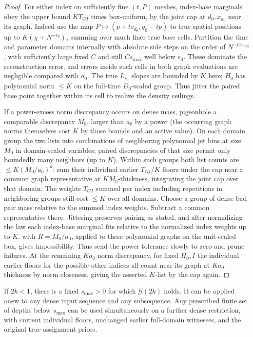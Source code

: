 \begin{proof}
For either index on sufficiently fine \((t,P)\) meshes, index-base marginals obey the upper bound \(K T_{GI}\) times box-uniform, by the joint cap at \(d_0,x_{a_0}\) near its graph. Indeed use the map \(P\mapsto(p+tv_{d_0},q_0-tp)\) to true spatial positions up to \(K(\chi+N^{-e_0})\), summing over much finer true base cells. Partition the time and parameter domains internally with absolute side steps on the order of \(N^{-C s_{\max}}\), with sufficiently large fixed \(C\) and still \(C s_{\max}\) well below \(e_0\). These dominate the reconstruction error, and errors inside such cells in both graph evaluations are negligible compared with \(a_0\). The true \(L_{s_0}\) slopes are bounded by \(K\) here; \(H_0\) has polynomial norm \(\le K\) on the full-time \(D_0\)-scaled group. Thus jitter the paired base point together within its cell to realize the density ceilings.

If a power-excess norm discrepancy occurs on dense mass, pigeonhole a comparable discrepancy \(M_0\), larger than \(a_0\) by a power (the occurring graph norms themselves cost \(K\) by those bounds and an active value). On each domain group the two lists into combinations of neighboring polynomial jet bins at size \(M_0\) in domain-scaled variables; paired discrepancies of that size permit only boundedly many neighbors (up to \(K\)). Within such groups both list counts are \(\le K(M_0/a_0)^d\): sum their individual earlier \(T_{GI}/K\) floors under the cap near a common graph representative at \(K M_0\)-thickness, integrating the joint cap over that domain. The weights \(T_{GI}\) summed per index including repetitions in neighboring groups still cost \(\le K\) over all domains. Choose a group of dense bad-pair mass relative to the summed index weights. Subtract a common representative there. Jittering preserves pairing as stated, and after normalizing the law each index-base marginal fits relative to the normalized index weights up to \(K\).  with \(R=M_0/a_0\), applied to these polynomial graphs on the unit-scaled box, gives impossibility. Thus send the power tolerance slowly to zero and prune failures. At the remaining \(K a_0\) norm discrepancy, for fixed \(H_0,I\) the individual earlier floors for the possible other indices all count near its graph at \(K a_0\)-thickness by norm closeness, giving the asserted \(K\)-list by the cap again.

\end{proof}

\begin{proposition}
\label{prop:bootstrap}
If \(2k<1\), there is a fixed \(s_{\max}>0\) for which
\(\mathcal G(2k)\) holds.  It can be applied anew to any dense input
sequence and any subsequence.  Any prescribed finite set of depths
below \(s_{\max}\) can be used simultaneously on a further dense
restriction, with current individual floors, unchanged earlier
full-domain witnesses, and the original true assignment priors.
\end{proposition}


